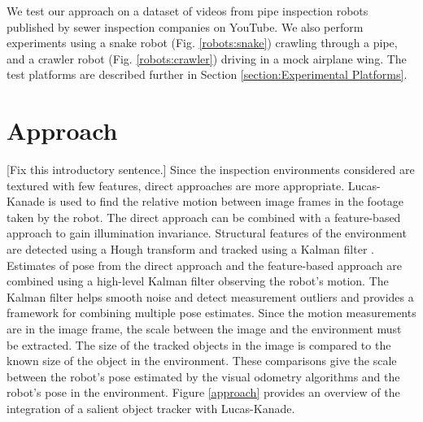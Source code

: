\documentclass[letterpaper, 10 pt, conference]{ieeeconf}
\newcommand{\comment}[1]{{\color{red}[#1]}}
\begin{document}

We test our approach on a dataset of videos from pipe inspection robots published by sewer inspection companies on YouTube. We also perform experiments using a snake robot (Fig. \ref{robots:snake}) crawling through a pipe, and a crawler robot (Fig. \ref{robots:crawler}) driving in a mock airplane wing. The test platforms are described further in Section \ref{section:Experimental Platforms}.


\section{Approach}



\comment{Fix this introductory sentence.} Since the inspection environments considered are textured with few features, direct approaches are more appropriate. Lucas-Kanade \cite{Lucas81, lucaskanade} is used to find the relative motion between image frames in the footage taken by the robot. The direct approach can be combined with a feature-based approach to gain illumination invariance. Structural features of the environment are detected using a Hough transform \cite{Hough59, Ballard81} and tracked using a Kalman filter \cite{Kalman82}. Estimates of pose from the direct approach and the feature-based approach are combined using a high-level Kalman filter observing the robot's motion. The Kalman filter helps smooth noise and detect measurement outliers and provides a framework for combining multiple pose estimates. Since the motion measurements are in the image frame, the scale between the image and the environment must be extracted. The size of the tracked objects in the image is compared to the known size of the object in the environment. These comparisons give the scale between the robot's pose estimated by the visual odometry algorithms and the robot's pose in the environment. Figure \ref{approach} provides an overview of the integration of a salient object tracker with Lucas-Kanade.
\end{document}

